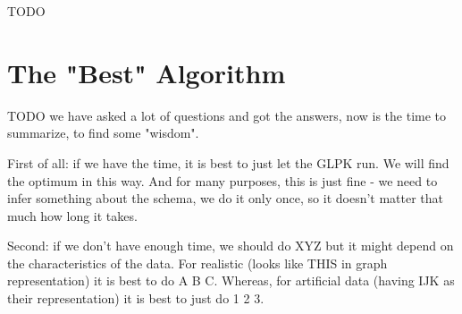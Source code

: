 TODO

\section{The "Best" Algorithm}

TODO we have asked a lot of questions and got the answers, now is the time to summarize, to find some "wisdom".

First of all: if we have the time, it is best to just let the GLPK run.
We will find the optimum in this way.
And for many purposes, this is just fine - we need to infer something about the schema, we do it only once, so it doesn't matter that much how long it takes.

Second: if we don't have enough time, we should do XYZ but it might depend on the characteristics of the data.
For realistic (looks like THIS in graph representation) it is best to do A B C.
Whereas, for artificial data (having IJK as their representation) it is best to just do 1 2 3.
